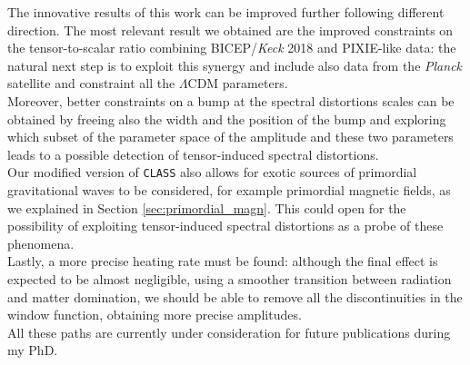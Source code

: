 The innovative results of this work can be improved further following different direction. The most relevant result we obtained are the improved constraints on the tensor-to-scalar ratio combining BICEP/\emph{Keck} 2018 and PIXIE-like data: the natural next step is to exploit this synergy and include also data from the \emph{Planck} satellite and constraint all the $\Lambda$CDM parameters.\\
Moreover, better constraints on a bump at the spectral distortions scales can be obtained by freeing also the width and the position of the bump and exploring which subset of the parameter space of the amplitude and these two parameters leads to a possible detection of tensor-induced spectral distortions.\\
Our modified version of \texttt{CLASS} also allows for exotic sources of primordial gravitational waves to be considered, for example primordial magnetic fields, as we explained in Section \ref{sec:primordial_magn}. This could open for the possibility of exploiting tensor-induced spectral distortions as a probe of these phenomena.\\
Lastly, a more precise heating rate must be found: although the final effect is expected to be almost negligible, using a smoother transition between radiation and matter domination, we should be able to remove all the discontinuities in the window function, obtaining more precise amplitudes.\\
All these paths are currently under consideration for future publications during my PhD. 



